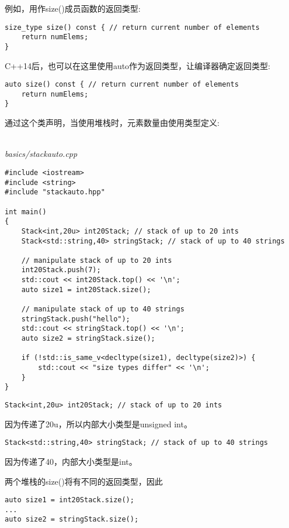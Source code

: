 例如，用作size()成员函数的返回类型:

\begin{lstlisting}[style=styleCXX]
size_type size() const { // return current number of elements
	return numElems;
}
\end{lstlisting}

C++14后，也可以在这里使用auto作为返回类型，让编译器确定返回类型:

\begin{lstlisting}[style=styleCXX]
auto size() const { // return current number of elements
	return numElems;
}
\end{lstlisting}

通过这个类声明，当使用堆栈时，元素数量由使用类型定义:

\hspace*{\fill} \\ %
\noindent
\textit{basics/stackauto.cpp}
\begin{lstlisting}[style=styleCXX]
#include <iostream>
#include <string>
#include "stackauto.hpp"

int main()
{
	Stack<int,20u> int20Stack; // stack of up to 20 ints
	Stack<std::string,40> stringStack; // stack of up to 40 strings
	
	// manipulate stack of up to 20 ints
	int20Stack.push(7);
	std::cout << int20Stack.top() << '\n';
	auto size1 = int20Stack.size();
	
	// manipulate stack of up to 40 strings
	stringStack.push("hello");
	std::cout << stringStack.top() << '\n';
	auto size2 = stringStack.size();
	
	if (!std::is_same_v<decltype(size1), decltype(size2)>) {
		std::cout << "size types differ" << '\n';
	}
}
\end{lstlisting}


\begin{lstlisting}[style=styleCXX]
Stack<int,20u> int20Stack; // stack of up to 20 ints
\end{lstlisting}

因为传递了20u，所以内部大小类型是unsigned int。

\begin{lstlisting}[style=styleCXX]
Stack<std::string,40> stringStack; // stack of up to 40 strings
\end{lstlisting}

因为传递了40，内部大小类型是int。

两个堆栈的size()将有不同的返回类型，因此

\begin{lstlisting}[style=styleCXX]
auto size1 = int20Stack.size();
...
auto size2 = stringStack.size();
\end{lstlisting}

